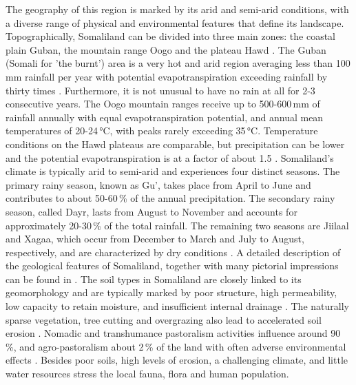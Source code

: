 The geography of this region is marked by its arid and semi-arid conditions, with a diverse range of physical and environmental features that define its landscape. Topographically, Somaliland can be divided into three main zones: the coastal plain Guban, the mountain range Oogo and the plateau Hawd \autocite{republicofsomaliaCountryProfile20212021}. The Guban (Somali for 'the burnt') area is a very hot and arid region averaging less than 100\,mm rainfall per year with potential evapotranspiration exceeding rainfall by thirty times \autocite{salemTerritorialDiagnosticReport2016}. Furthermore, it is not unusual to have no rain at all for 2-3 consecutive years. The Oogo mountain ranges receive up to 500-600\,mm of rainfall annually with equal evapotranspiration potential, and annual mean temperatures of 20-24\,°C, with peaks rarely exceeding 35\,°C. Temperature conditions on the Hawd plateaus are comparable, but precipitation can be lower and the potential evapotranspiration is at a factor of about 1.5 \autocite{abdulkadirAssessmentDroughtRecurrence2017,salemTerritorialDiagnosticReport2016}.\newline
Somaliland's climate is typically arid to semi-arid and experiences four distinct seasons. The primary rainy season, known as Gu', takes place from April to June and contributes to about 50-60\,\% of the annual precipitation. The secondary rainy season, called Dayr, lasts from August to November and accounts for approximately 20-30\,\% of the total rainfall. The remaining two seasons are Jiilaal and Xagaa, which occur from December to March and July to August, respectively, and are characterized by dry conditions \autocite{abdulkadirAssessmentDroughtRecurrence2017,republicofsomaliaCountryProfile20212021}.\newline
A detailed description of the geological features of Somaliland, together with many pictorial impressions can be found in \autocite{petrucciLandscapeLandformsNorthern2022}. The soil types in Somaliland are closely linked to its geomorphology and are typically marked by poor structure, high permeability, low capacity to retain moisture, and insufficient internal drainage \autocite{salemTerritorialDiagnosticReport2016}. The naturally sparse vegetation, tree cutting and overgrazing also lead to accelerated soil erosion \autocite{salemTerritorialDiagnosticReport2016}. Nomadic and transhumance pastoralism activities influence around 90\,\%, and agro-pastoralism about 2\,\% of the land with often adverse environmental effects \autocite{salemTerritorialDiagnosticReport2016}. Besides poor soils, high levels of erosion, a challenging climate, and little water resources stress the local fauna, flora and human population. 

